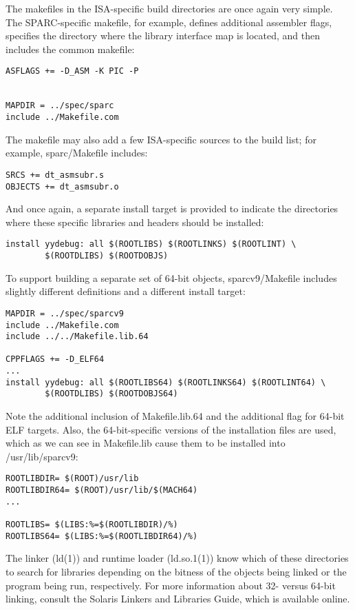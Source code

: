 \documentclass{article}
\begin{document}
The makefiles in the ISA-specific build directories are once again very
simple. The SPARC-specific makefile, for example, defines additional assembler
flags, specifies the directory where the library interface map is located, and
then includes the common makefile:

\begin{verbatim}
ASFLAGS += -D_ASM -K PIC -P


MAPDIR = ../spec/sparc
include ../Makefile.com
\end{verbatim}

The makefile may also add a few ISA-specific sources to the build list; for
example, sparc/Makefile includes:

\begin{verbatim}
SRCS += dt_asmsubr.s
OBJECTS += dt_asmsubr.o
\end{verbatim}

And once again, a separate install target is provided to indicate the
directories where these specific libraries and headers should be installed:

\begin{verbatim}
install yydebug: all $(ROOTLIBS) $(ROOTLINKS) $(ROOTLINT) \
        $(ROOTDLIBS) $(ROOTDOBJS)
\end{verbatim}

To support building a separate set of 64-bit objects, sparcv9/Makefile includes
slightly different definitions and a different install target:

\begin{verbatim}
MAPDIR = ../spec/sparcv9
include ../Makefile.com
include ../../Makefile.lib.64

CPPFLAGS += -D_ELF64
...
install yydebug: all $(ROOTLIBS64) $(ROOTLINKS64) $(ROOTLINT64) \
        $(ROOTDLIBS) $(ROOTDOBJS64)
\end{verbatim}

Note the additional inclusion of Makefile.lib.64 and the additional flag for
64-bit ELF targets. Also, the 64-bit-specific versions of the installation
files are used, which as we can see in Makefile.lib cause them to be installed
into /usr/lib/sparcv9:

\begin{verbatim}
ROOTLIBDIR= $(ROOT)/usr/lib
ROOTLIBDIR64= $(ROOT)/usr/lib/$(MACH64)
...

ROOTLIBS= $(LIBS:%=$(ROOTLIBDIR)/%)
ROOTLIBS64= $(LIBS:%=$(ROOTLIBDIR64)/%)
\end{verbatim}

\vspace{0.2cm}
The linker (ld(1)) and runtime loader (ld.so.1(1)) know which of these
directories to search for libraries depending on the bitness of the objects
being linked or the program being run, respectively. For more information about
32- versus 64-bit linking, consult the Solaris Linkers and Libraries Guide,
which is available online.
\end{document}
